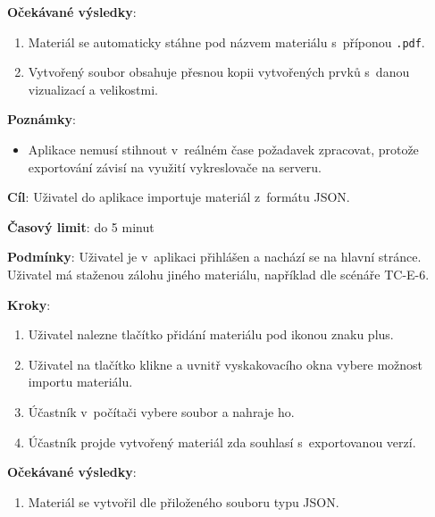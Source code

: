 \textbf{Očekávané výsledky}:

\begin{enumerate}[leftmargin=1.4cm]
    \item Materiál se automaticky stáhne pod názvem materiálu s~příponou \verb|.pdf|.
    \item Vytvořený soubor obsahuje přesnou kopii vytvořených prvků s~danou vizualizací a velikostmi.
\end{enumerate}

\textbf{Poznámky}:

\begin{itemize}[leftmargin=1.4cm]
    \item Aplikace nemusí stihnout v~reálném čase požadavek zpracovat, protože exportování závisí na využití vykreslovače na serveru.
\end{itemize}





\vspace{1em}

\textbf{Cíl}: Uživatel do aplikace importuje materiál z~formátu JSON.

\textbf{Časový limit}: do 5 minut

\textbf{Podmínky}:  Uživatel je v~aplikaci přihlášen a nachází se na hlavní stránce. Uživatel má staženou zálohu jiného materiálu, například dle scénáře TC-E-6.

\textbf{Kroky}:

\begin{enumerate}[leftmargin=1.4cm]
    \item Uživatel nalezne tlačítko přidání materiálu pod ikonou znaku plus.
    \item Uživatel na tlačítko klikne a uvnitř vyskakovacího okna vybere možnost importu materiálu.
    \item Účastník v~počítači vybere soubor a nahraje ho.
    \item Účastník projde vytvořený materiál zda souhlasí s~exportovanou verzí.
\end{enumerate}

\vspace{2em}
\textbf{Očekávané výsledky}:

\begin{enumerate}[leftmargin=1.4cm]
    \item Materiál se vytvořil dle přiloženého souboru typu JSON.
\end{enumerate}






